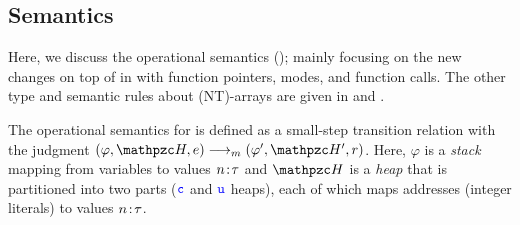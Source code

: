 \subsection{Semantics}\label{sec:semantics}



Here, we discuss the \lang operational semantics (); 
mainly focusing on the new changes on top of \checkedc in \cite{li22checkedc} with function pointers, modes, and function calls.
The other type and semantic rules about (NT)-arrays are given in \cite{li22checkedc} and .


The operational semantics for \lang is defined as a small-step
transition relation with the judgment $ (\varphi,\heap,e)
\longrightarrow_m (\varphi',\heap',r)$.
 Here, $\varphi$ is a
\emph{stack} mapping from variables to values ${n}\!:\!{\tau}$ and
$\heap$ is a \emph{heap} that is partitioned into two parts ($\textcolor{blue}{\texttt{c}}$ and $\textcolor{blue}{\texttt{u}}$ heaps), each of which
maps addresses (integer literals) to values ${n}\!:\!{\tau}$.

